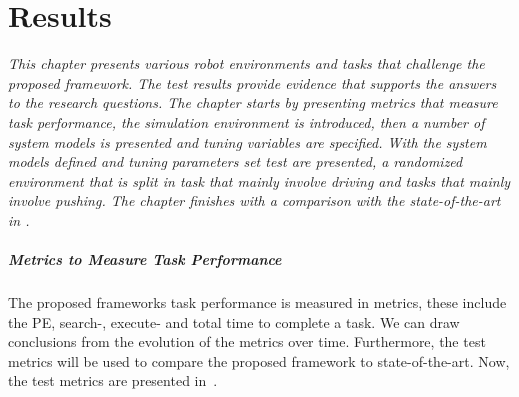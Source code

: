 \chapter{Results}%
\label{chap:results}
\textit{This chapter presents various robot environments and tasks that challenge the proposed framework. The test results provide evidence that supports the answers to the research questions. The chapter starts by presenting metrics that measure task performance, the simulation environment is introduced, then a number of system models is presented and tuning variables are specified. With the system models defined and tuning parameters set test are presented, a randomized environment that is split in task that mainly involve driving and tasks that mainly involve pushing. The chapter finishes with a comparison with the state-of-the-art in .\bs}

\paragraph{Metrics to Measure Task Performance}
The proposed frameworks task performance is measured in metrics, these include the \ac{PE}, search-, execute- and total time to complete a task. We can draw conclusions from the evolution of the metrics over time. Furthermore, the test metrics will be used to compare the proposed framework to state-of-the-art. Now, the test metrics are presented in~.\bs

